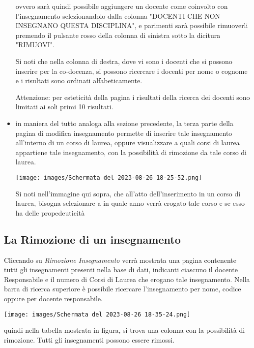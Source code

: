 \documentclass{article}
\begin{document}
\begin{itemize}
        ovvero sarà quindi possibile aggiungere un docente come coinvolto con l'insegnamento selezionandolo dalla colonna "DOCENTI CHE NON INSEGNANO QUESTA DISCIPLINA", e parimenti sarà possibile rimuoverli premendo il pulsante rosso della colonna di sinistra sotto la dicitura "RIMUOVI".

        Si noti che nella colonna di destra, dove vi sono i docenti che si possono inserire per la co-docenza, si possono ricercare i docenti per nome o cognome e i risultati sono ordinati alfabeticamente.

        Attenzione: per esteticità della pagina i risultati della ricerca dei docenti sono limitati ai soli primi 10 risultati.

        \item in maniera del tutto analoga alla sezione precedente, la terza parte della pagina di modifica insegnamento permette di inserire tale insegnamento all'interno di un corso di laurea, oppure visualizzare a quali corsi di laurea appartiene tale insegnamento, con la possibilità di rimozione da tale corso di laurea.

        \begin{center}
            \texttt{[image: images/Schermata del 2023-08-26 18-25-52.png]}
        \end{center}

        Si noti nell'immagine qui sopra, che all'atto dell'inserimento in un corso di laurea, bisogna selezionare a in quale anno verrà erogato tale corso e se esso ha delle propedeuticità
    \end{itemize}

    \subsection{La Rimozione di un insegnamento}
    Cliccando su \textit{Rimozione Insegnamento} verrà mostrata una pagina contenente tutti gli insegnamenti presenti nella base di dati, indicanti ciascuno il docente Responsabile e il numero di Corsi di Laurea che erogano tale insegnamento. Nella barra di ricerca superiore è possibile ricercare l'insegnamento per nome, codice oppure per docente responsabile.

    \begin{center}
        \texttt{[image: images/Schermata del 2023-08-26 18-35-24.png]}
    \end{center}

    quindi nella tabella mostrata in figura, si trova una colonna con la possibilità di rimozione. Tutti gli insegnamenti possono essere rimossi.
\end{document}
